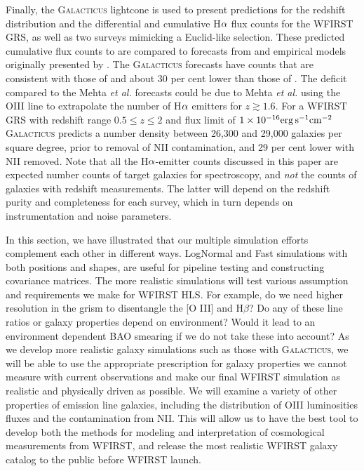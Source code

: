 Finally, the \textsc{Galacticus} lightcone is used to present predictions for
the redshift distribution and the differential and cumulative H${\rm \alpha}$
flux counts for the WFIRST GRS, as well as two surveys mimicking a Euclid-like
selection. These predicted cumulative flux counts to are compared to forecasts
from \citet{Mehta2015} and empirical models originally presented by
\citet{Pozzetti15}. The \textsc{Galacticus} forecasts have counts that are
consistent with those of \citet{Pozzetti15} and about 30 per cent lower than
those of \citet{Mehta2015}. The deficit compared to the Mehta \textit{et al.}
forecasts could be due to Mehta \textit{et al.} using the OIII line to
extrapolate the number of H${\rm \alpha}$ emitters for $z\gtrsim1.6$. For a
WFIRST GRS with redshift range $0.5\leqslant z\leqslant 2$ and flux limit of
$1\times 10^{-16}{\rm erg}\,{\rm s}^{-1}{\rm cm}^{-2}$ \textsc{Galacticus}
predicts a number density between 26,300 and 29,000 galaxies per square degree,
prior to removal of NII contamination, and 29 per cent lower with NII removed.
Note that all the H${\rm \alpha}$-emitter counts discussed in this paper are
expected number counts of target galaxies for spectroscopy, and \emph{not} the
counts of galaxies with redshift measurements. The latter will depend on the
redshift purity and completeness for each survey, which in turn depends on
instrumentation and noise parameters.

\begin{summary}
In this section, we have illustrated that our multiple simulation efforts
complement each other in different ways. LogNormal and Fast simulations with
both positions and shapes,  are useful for pipeline testing and constructing
covariance matrices. The more realistic simulations will test various assumption
and requirements we make for WFIRST HLS. For example, do we need higher
resolution in the grism to disentangle the [O III] and  H$\beta$? Do any of
these line ratios or galaxy properties depend on environment?  Would it lead to an environment dependent BAO smearing if we do not take these into account?  As
we develop more realistic galaxy simulations such as those with \textsc{Galacticus}, we will be able to use the appropriate prescription for
galaxy properties we cannot measure with current observations and make our final
WFIRST simulation as realistic and physically driven as possible. We will examine a variety of other properties of emission line galaxies, including the distribution of OIII luminosities fluxes and the contamination from NII.
This will allow us to have the best tool to develop both the methods for modeling and interpretation of cosmological measurements from WFIRST, and release the most
realistic WFIRST galaxy catalog to the public before WFIRST launch.
\end{summary}

